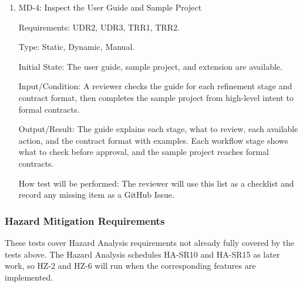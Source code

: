 \documentclass[12pt, titlepage]{article}
\begin{document}
\begin{enumerate}
Output/Result: All three tasks are completed using the guide.

How test will be performed: An observer will record each point where help was needed or
the guide was incorrect, and record these as GitHub Issues.

\item{MD-4: Inspect the User Guide and Sample Project\\}

Requirements: UDR2, UDR3, TRR1, TRR2.

Type: Static, Dynamic, Manual.

Initial State: The user guide, sample project, and extension are available.

Input/Condition: A reviewer checks the guide for each refinement stage and contract
format, then completes the sample project from high-level intent to formal contracts.

Output/Result: The guide explains each stage, what to review, each available action, and
the contract format with examples. Each workflow stage shows what to check before
approval, and the sample project reaches formal contracts.

How test will be performed: The reviewer will use this list as a checklist and record any
missing item as a GitHub Issue.

\end{enumerate}

\subsubsection{Hazard Mitigation Requirements}

These tests cover Hazard Analysis requirements not already fully covered by the tests
above. The Hazard Analysis schedules HA-SR10 and HA-SR15 as later work, so HZ-2 and HZ-6
will run when the corresponding features are implemented.
\end{document}
